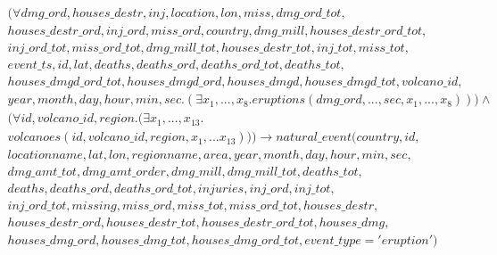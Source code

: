 \documentclass{article}
\begin{document}
\begin{multline}
(\forall dmg\_ord,  houses\_destr,  inj,  location,  lon,  miss,  dmg\_ord\_tot,  \\ houses\_destr\_ord,  inj\_ord,  miss\_ord,  country,  dmg\_mill,  houses\_destr\_ord\_tot, \\  inj\_ord\_tot,  miss\_ord\_tot,  dmg\_mill\_tot,  houses\_destr\_tot,  inj\_tot,  miss\_tot,  \\  event\_ts,  id, lat,  deaths,  deaths\_ord,  deaths\_ord\_tot,  deaths\_tot,  \\ houses\_dmgd\_ord\_tot,  houses\_dmgd\_ord,  houses\_dmgd,  houses\_dmgd\_tot,  volcano\_id, \\  year,  month,  day,  hour,  min,  sec.(
\exists x_1, ..., x_{8}. eruptions(dmg\_ord, ..., sec, x_1, ..., x_{8}))) \wedge \\ 
(\forall id, volcano\_id, region.(
\exists x_1,..., x_{13}. \\
volcanoes(id, volcano\_id, region, 
x_1,... x_{13}))) \longrightarrow natural\_event(country, id, \\ locationname, lat, lon,  regionname, area, year, month, day, hour, min, sec, \\ dmg\_amt\_tot, dmg\_amt\_order, dmg\_mill, dmg\_mill\_tot, deaths\_tot, \\ deaths, deaths\_ord, deaths\_ord\_tot, injuries, inj\_ord, inj\_tot, \\ inj\_ord\_tot, missing, miss\_ord, miss\_tot, miss\_ord\_tot, houses\_destr, \\ houses\_destr\_ord, houses\_destr\_tot, houses\_destr\_ord\_tot, houses\_dmg, \\ houses\_dmg\_ord, houses\_dmg\_tot, houses\_dmg\_ord\_tot, event\_type =  'eruption')
\end{multline} 
\end{document}

